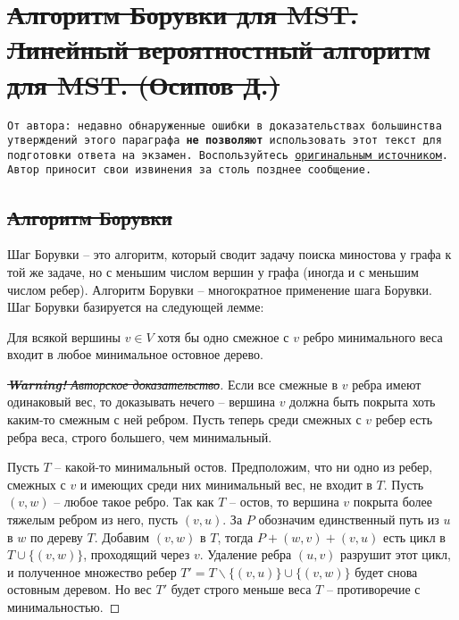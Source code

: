 \section{\sout{Алгоритм Борувки для MST. Линейный вероятностный алгоритм для MST. (Осипов Д.)}}

\newcommand{\achtung}{\color{red}\textbf{Warning!} Авторское доказательство}

\texttt{От автора: недавно обнаруженные ошибки в доказательствах большинства утверждений этого параграфа {\bf не позволяют} использовать этот текст для подготовки ответа на экзамен. Воспользуйтесь \href{https://rajsain.files.wordpress.com/2013/11/randomized-algorithms-motwani-and-raghavan.pdf}{оригинальным источником}. Автор приносит свои извинения за столь позднее сообщение.}

\subsection{\sout{Алгоритм Борувки}}
Шаг Борувки -- это алгоритм, который сводит задачу поиска миностова у графа к той же задаче, но с меньшим числом вершин у графа (иногда и с меньшим числом ребер). Алгоритм Борувки -- многократное применение шага Борувки. Шаг Борувки базируется на следующей лемме:

\begin{lemma*} Для всякой вершины $v \in V$ хотя бы одно смежное с $v$ ребро минимального веса входит в любое минимальное остовное дерево. \end{lemma*}
\begin{proof}[\sout{\achtung}]
Если все смежные в $v$ ребра имеют одинаковый вес, то доказывать нечего -- вершина $v$ должна быть покрыта хоть каким-то смежным с ней ребром. Пусть теперь среди смежных с $v$ ребер есть ребра веса, строго большего, чем минимальный.

Пусть $T$ -- какой-то минимальный остов. Предположим, что ни одно из ребер, смежных с $v$ и имеющих среди них минимальный вес, не входит в $T$. Пусть $(v, w)$ -- любое такое ребро. Так как $T$ -- остов, то вершина $v$ покрыта более тяжелым ребром из него, пусть $(v, u)$. За $P$ обозначим единственный путь из $u$ в $w$ по дереву $T$. Добавим $(v, w)$ в $T$, тогда $P + (w, v) + (v, u)$ есть цикл в $T\cup\{(v, w)\}$, проходящий через $v$. Удаление ребра $(u, v)$ разрушит этот цикл, и полученное множество ребер $T' = T\smallsetminus \{(v, u)\} \cup \{(v, w)\}$ будет снова остовным деревом. Но вес $T'$ будет строго меньше веса $T$ -- противоречие с минимальностью.
\end{proof}

